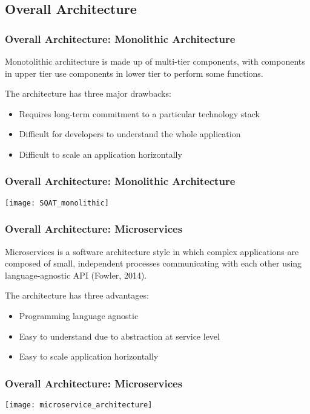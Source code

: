 \subsection{Overall Architecture}
\begin{frame}
\frametitle{Overall Architecture: Monolithic Architecture}

\begin{definition}
Monotolithic architecture is made up of multi-tier components, with components in upper tier use components in lower tier to perform some functions.
\end{definition}

The architecture has three major drawbacks:
\begin{itemize}
  \item Requires long-term commitment to a particular technology stack
  \item Difficult for developers to understand the whole application
  \item Difficult to scale an application horizontally
\end{itemize}
\end{frame}

\begin{frame}
\frametitle{Overall Architecture: Monolithic Architecture}

\begin{center}
\texttt{[image: SQAT\_monolithic]}
\end{center}

\end{frame}

\begin{frame}
\frametitle{Overall Architecture: Microservices}

\begin{definition}
Microservices is a software architecture style in which complex applications are composed of small, independent processes communicating with each other using language-agnostic API (Fowler, 2014).
\end{definition}

The architecture has three advantages:
\begin{itemize}
  \item Programming language agnostic
  \item Easy to understand due to abstraction at service level
  \item Easy to scale application horizontally
\end{itemize}
\end{frame}

\begin{frame}
\frametitle{Overall Architecture: Microservices}
\begin{center}
\texttt{[image: microservice\_architecture]}
\end{center}
\end{frame}